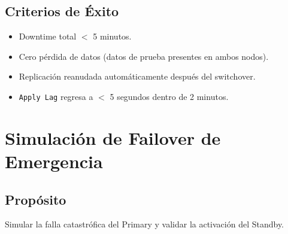 \documentclass[11pt, a4paper]{report}
\begin{document}
\subsection{Criterios de Éxito}
\begin{itemize}
    \item Downtime total $<$ 5 minutos.
    \item Cero pérdida de datos (datos de prueba presentes en ambos nodos).
    \item Replicación reanudada automáticamente después del switchover.
    \item \texttt{Apply Lag} regresa a $<$ 5 segundos dentro de 2 minutos.
\end{itemize}

\section{Simulación de Failover de Emergencia}

\subsection{Propósito}
Simular la falla catastrófica del Primary y validar la activación del Standby.
\end{document}
